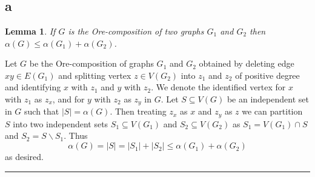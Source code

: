 \documentclass[letterpaper,12pt,oneside,onecolumn]{article}
\newenvironment{proof}{{\bf Proof:  }}{\hfill\rule{2mm}{2mm}}
\newtheorem{lemma}[fact]{Lemma}
\begin{document}
\section{}
\subsection{a}
\begin{lemma}
	If $G$ is the Ore-composition of two graphs $G_1$ and $G_2$ then $\alpha(G) \leq \alpha(G_1) + \alpha(G_2)$.
\end{lemma}
\begin{proof}
Let $G$ be the Ore-composition of graphs $G_1$ and $G_2$ obtained by deleting edge $xy \in E(G_1)$ and splitting vertex $z \in V(G_2)$ into $z_1$ and $z_2$ of positive degree and identifying $x$ with $z_1$ and $y$ with $z_2$. We denote the identified vertex for $x$ with $z_1$ as $z_x$, and for $y$ with $z_2$ as $z_y$ in $G$. Let $S \subseteq V(G)$ be an independent set in $G$ such that $|S| = \alpha (G)$. 
Then treating $z_x$ as $x$ and $z_y$ as $z$ we can partition $S$ into two independent sets $S_1\subseteq V(G_1)$ and $S_2\subseteq V(G_2)$ as $S_1 = V(G_1) \cap S$ and $S_2 = S\backslash S_1$. Thus
$$\alpha(G) = |S| = |S_1| + |S_2| \leq \alpha(G_1) + \alpha(G_2)$$
as desired.
\end{proof}
\end{document}
